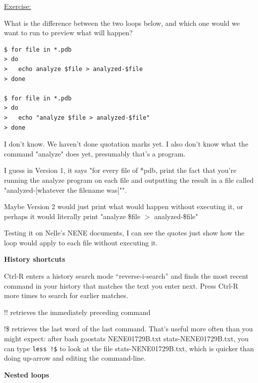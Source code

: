 \documentclass[12pt]{article}
\begin{document}
\newpage\begin{addmargin}[1cm]{0cm}
\color{gray}
\vspace{1em}\underline{Exercise:}

What is the difference between the two loops below, and which one would we want to run to preview what will happen?
\vspace{-1em}\begin{verbatim}
$ for file in *.pdb
> do
>   echo analyze $file > analyzed-$file
> done

$ for file in *.pdb
> do
>   echo "analyze $file > analyzed-$file"
> done
\end{verbatim}\vspace{-0.5em}
\color{black}
I don't know. We haven't done quotation marks yet. I also don't know what the command "analyze" does yet, presumably that's a program. 

I guess in Version 1, it says "for every file of *pdb, print the fact that you're running the analyze program on each file and outputting the result in a file called "analyzed-[whatever the filename was]"".

Maybe Version 2 would just print what would happen without executing it, or perhaps it would literally print "analyze \$file $>$ analyzed-\$file"

Testing it on Nelle's NENE documents, I can see the quotes just show how the loop would apply to each file without executing it.
\end{addmargin}

\vspace{1em}
\textbf{History shortcuts}

Ctrl-R enters a history search mode “reverse-i-search” and finds the most recent command in your history that matches the text you enter next. Press Ctrl-R more times to search for earlier matches.

!! retrieves the immediately preceding command

!\$ retrieves the last word of the last command. That’s useful more often than you might expect: after bash goostats NENE01729B.txt stats-NENE01729B.txt, you can type \texttt{less !\$} to look at the file stats-NENE01729B.txt, which is quicker than doing up-arrow and editing the command-line.

\vspace{1em}
\textbf{Nested loops}
\end{document}
